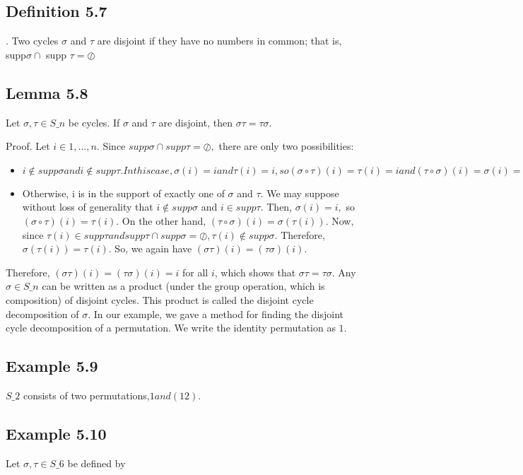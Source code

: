 \subsection{Definition 5.7}. Two cycles $\sigma$ and $\tau$ are disjoint if they have no numbers in common; that is, supp$\sigma \cap$ 
supp $\tau = \oslash$

\subsection{Lemma 5.8} Let $\sigma,\tau\in S\_n$ be cycles. If $\sigma$ and $\tau$ are disjoint, then $\sigma\tau = \tau\sigma$.

Proof. Let $i\in{1, . . . , n}.$ Since $supp \sigma\cap supp \tau = \oslash,$ there are only two possibilities:
\begin{itemize}
\item $i \notin supp \sigma and i \notin supp \tau. In this case, \sigma(i) = i and \tau(i) = i, so (\sigma \circ \tau)(i) =\tau(i) = i and
(\tau \circ \sigma)(i) = \sigma(i) = i.$

\item Otherwise, i is in the support of exactly one of $\sigma$ and $\tau$. We may suppose without loss of generality that
$i \notin supp \sigma$ and $i \in supp \tau.$ Then, $\sigma(i) = i,$ so $(\sigma \circ \tau)(i) = \tau(i).$ On the other hand, $(\tau \circ \sigma)(i) = \sigma(\tau(i)).$
Now, since $\tau(i) \in supp \tau and supp \tau \cap supp \sigma = \oslash, \tau(i) \notin supp \sigma.$ Therefore, $\sigma(\tau(i)) = \tau(i).$ So, we
again have $(\sigma\tau)(i) = (\tau\sigma)(i).$
\end{itemize}

Therefore, $(\sigma \tau)(i) = (\tau \sigma)(i) = i$ for all $i$, which shows that $\sigma \tau= \tau \sigma.$
Any $\sigma \in S\_n$ can be written as a product (under the group operation, which is composition) of disjoint cycles.
This product is called the disjoint cycle decomposition of $\sigma.$ In our example, we gave a method for finding
the disjoint cycle decomposition of a permutation.
We write the identity permutation as $1$.

\subsection{Example 5.9} $S\_2$ consists of two permutations,$ 1 and (1 2).$

\subsection{Example 5.10} Let $\sigma, \tau \in S\_6$ be defined by

